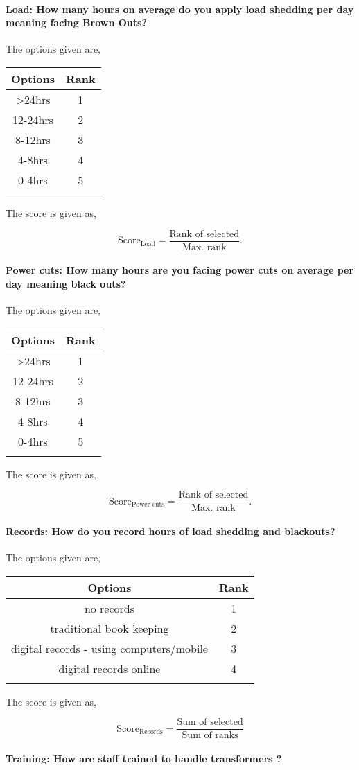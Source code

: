 \documentclass[oneside,twocolumn]{article}
\newcommand{\tsub}[2]{\text{#1}_{\text{#2}}}
\newcommand{\dsub}[2]{\dfrac{\text{#1}}{\text{#2}}}
\newcommand{\multsel}[1]
{
	\[
		\tsub{Score}{#1} = \dsub{Sum of selected}{Sum of ranks}
	\]
}
\newcommand{\singsel}[1]
{
	\[
		\tsub{Score}{#1} = \dsub{Rank of selected}{Max. rank}.
	\]
}
\newenvironment{ttable}
{
\begin{center}
\begin{tabular}{c|c}
\hline
}
{
\\ \hline
\end{tabular}
\end{center}
}
\begin{document}
\paragraph{Load: How many hours on average do you apply load shedding per day meaning facing Brown Outs?}

The options given are,
\begin{ttable}
Options & Rank \\ \hline
\textgreater 24hrs & 1 \\
12-24hrs & 2 \\
8-12hrs & 3 \\
4-8hrs & 4 \\
0-4hrs & 5 \\
\hline
\end{ttable}
The score is given as,
\singsel{Load}
\paragraph{Power cuts: How many hours are you facing power cuts on average per day meaning black outs?}

The options given are,
\begin{ttable}
Options & Rank \\ \hline
\textgreater 24hrs & 1 \\
12-24hrs & 2 \\
8-12hrs & 3 \\
4-8hrs & 4 \\
0-4hrs & 5 \\
\hline
\end{ttable}
The score is given as,
\singsel{Power cuts}
\paragraph{Records: How do you record hours of load shedding and blackouts?}

The options given are,
\begin{ttable}
Options & Rank \\ \hline
no records & 1 \\
traditional book keeping & 2 \\
digital records - using computers/mobile & 3 \\
digital records online & 4 \\
\hline
\end{ttable}
The score is given as,
\multsel{Records}
\paragraph{Training: How are staff trained to handle transformers ?}
\end{document}

